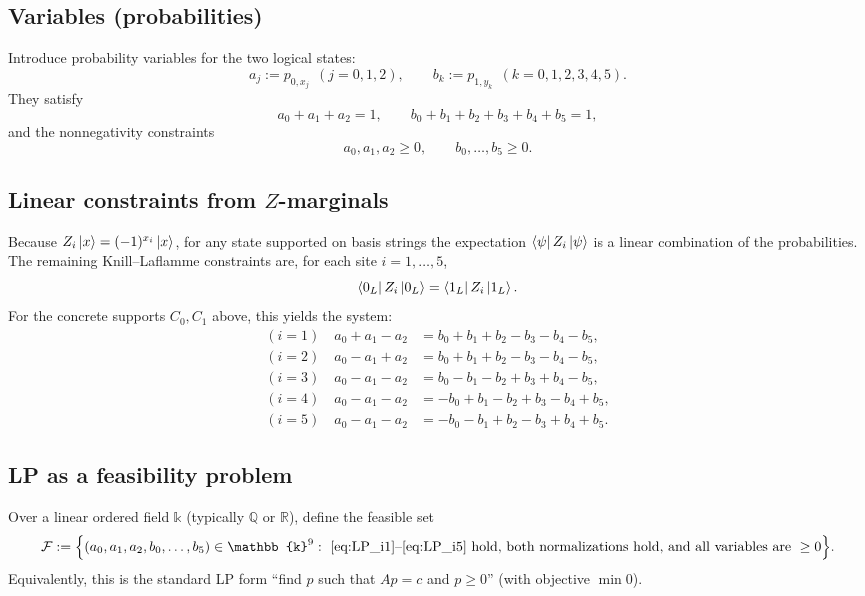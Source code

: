 \documentclass[11pt]{article}
\begin{document}
\subsection{Variables (probabilities)}

Introduce probability variables for the two logical states:
\[
a_j := p_{0,x_j}\ \ (j=0,1,2),\qquad b_k := p_{1,y_k}\ \ (k=0,1,2,3,4,5).
\]
They satisfy
\[
a_0+a_1+a_2=1,\qquad b_0+b_1+b_2+b_3+b_4+b_5=1,
\]
and the nonnegativity constraints
\[
a_0,a_1,a_2\ge 0,\qquad b_0,\dots,b_5\ge 0.
\]

\subsection{Linear constraints from $Z$-marginals}

Because $Z_i\ket{x}=(-1)^{x_i}\ket{x}$, for any state supported on basis strings
the expectation $\bra{\psi}Z_i\ket{\psi}$ is a linear combination of the probabilities.
The remaining Knill--Laflamme constraints are, for each site $i=1,\dots,5$,
\[
\bra{0_L}Z_i\ket{0_L}=\bra{1_L}Z_i\ket{1_L}.
\]
For the concrete supports $C_0,C_1$ above, this yields the system:
\begin{align}
\label{eq:LP_i1}
(i = 1)\quad a_{0} + a_{1} - a_{2}
&= b_{0} + b_{1} + b_{2} - b_{3} - b_{4} - b_{5}, \\
\label{eq:LP_i2}
(i = 2)\quad a_{0} - a_{1} + a_{2}
&= b_{0} + b_{1} + b_{2} - b_{3} - b_{4} - b_{5}, \\
\label{eq:LP_i3}
(i = 3)\quad a_{0} - a_{1} - a_{2}
&= b_{0} - b_{1} - b_{2} + b_{3} + b_{4} - b_{5}, \\
\label{eq:LP_i4}
(i = 4)\quad a_{0} - a_{1} - a_{2}
&= -b_{0} + b_{1} - b_{2} + b_{3} - b_{4} + b_{5}, \\
\label{eq:LP_i5}
(i = 5)\quad a_{0} - a_{1} - a_{2}
&= -b_{0} - b_{1} + b_{2} - b_{3} + b_{4} + b_{5}.
\end{align}

\subsection{LP as a feasibility problem}

Over a linear ordered field $\mathbb{k}$ (typically $\mathbb{Q}$ or $\mathbb{R}$), define the feasible set
\[
\mathcal F
:=
\Bigl\{
(a_0,a_1,a_2,b_0,\dots,b_5)\in\mathbb{k}^9:
\ \text{\eqref{eq:LP_i1}--\eqref{eq:LP_i5} hold, both normalizations hold, and all variables are }\ge 0
\Bigr\}.
\]
Equivalently, this is the standard LP form ``find $p$ such that $A p = c$ and $p\ge 0$'' (with objective $\min 0$).
\end{document}
